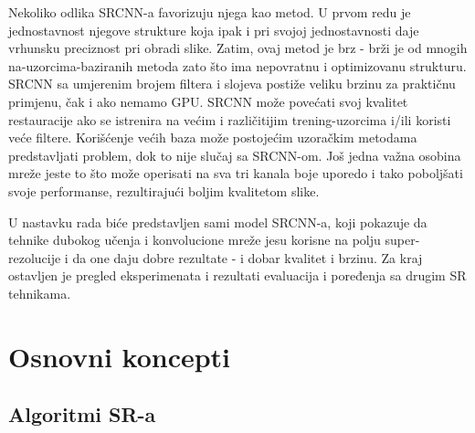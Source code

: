 \documentclass[12pt]{report}
\numberwithin{equation}{section}
\begin{document}
Nekoliko odlika SRCNN-a favorizuju njega kao metod. U prvom redu je jednostavnost njegove strukture koja ipak i pri svojoj jednostavnosti daje vrhunsku preciznost pri obradi slike. Zatim, ovaj metod je brz - brži je od mnogih na-uzorcima-baziranih metoda zato što ima nepovratnu i optimizovanu strukturu. SRCNN sa umjerenim brojem filtera i slojeva postiže veliku brzinu za praktičnu primjenu, čak i ako nemamo GPU. SRCNN može povećati svoj kvalitet restauracije ako se istrenira na većim i različitijim trening-uzorcima i/ili koristi veće filtere. Korišćenje većih baza može postojećim uzoračkim metodama predstavljati problem, dok to nije slučaj sa SRCNN-om. Još jedna važna osobina mreže jeste to što može operisati na sva tri kanala boje uporedo i tako poboljšati svoje performanse, rezultirajući boljim kvalitetom slike. 

U nastavku rada biće predstavljen sami model SRCNN-a, koji pokazuje da tehnike dubokog učenja i  konvolucione mreže jesu korisne na polju super-rezolucije i da one daju dobre rezultate - i dobar kvalitet i brzinu. Za kraj ostavljen je pregled eksperimenata i rezultati evaluacija i poređenja sa drugim SR tehnikama. 


\chapter{Osnovni koncepti}\label{ch2}

\section{Algoritmi SR-a}

\end{document}
